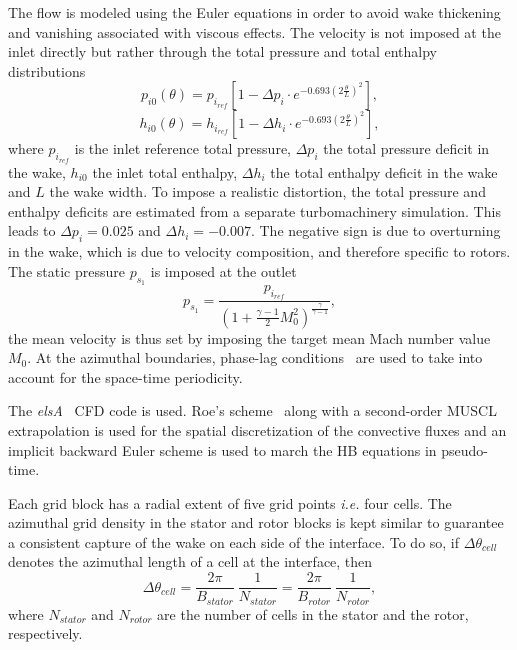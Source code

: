 The flow is modeled using the 
Euler equations in order to avoid wake thickening and vanishing
associated with viscous effects. 
The velocity is not imposed at the inlet directly
but rather through the total pressure and total enthalpy distributions
\begin{equation}
  \label{eq:rotatingblocks_ptot}
    p_{i0} (\theta) = p_{i_{ref}} \left[1 - 
        \Delta p_i \cdot e^{
          -0.693 \left( 2 \frac{\theta}{L} \right) ^ 2}\right],
\end{equation}
\begin{equation}
  \label{eq:rotatingblocks_htot}
    h_{i0} (\theta) = h_{i_{ref}} \left[1- 
        \Delta h_i \cdot e^{
          -0.693 \left( 2 \frac{\theta}{L} \right) ^ 2}\right],
\end{equation}
where $p_{i_{ref}}$ is the inlet reference total pressure, $\Delta p_i$ the total pressure
deficit in the wake,
$h_{i0}$ the inlet total enthalpy, $\Delta h_i$ the total enthalpy
deficit in the wake and $L$ the wake width.
To impose a realistic distortion, the total pressure and
enthalpy deficits are estimated from a separate turbomachinery simulation.
This leads to $\Delta p_i = 0.025$ and 
$\Delta h_i = - 0.007$.
The negative sign is due to overturning in the wake, which
is due to velocity composition, and therefore specific to rotors.
The static pressure $p_{s_1}$ is imposed at the outlet
\begin{equation}
    p_{s_1} = \frac{p_{i_{ref}}}{\left(1 + 
    \frac{\gamma - 1}{2} M_{0}^2 \right) ^ {\frac{\gamma}{ \gamma - 1}}} ,
\end{equation}
the mean velocity is thus set by imposing the
target mean Mach number value $M_{0}$.
At the azimuthal boundaries, phase-lag conditions~\cite{Erdos1977} 
are used to take into account for the space-time periodicity.

The \textit{elsA}~\cite{Cambier2013} CFD code is used.
Roe's scheme~\cite{Roe1981} along with a second-order MUSCL extrapolation 
is used for the spatial discretization of
the convective fluxes and an implicit backward Euler scheme is used
to march the HB equations in pseudo-time.

Each grid block has a radial extent of five grid points \emph{i.e.} four cells. 
The azimuthal grid density in the stator and rotor blocks is kept similar
to guarantee a consistent capture of the wake on each side of the interface.
To do so, if $\Delta \theta_{cell}$ denotes the azimuthal length of a cell
at the interface, then
\begin{equation}
   \Delta \theta_{cell} = \frac{2\pi}{B_{stator}}~\frac{1}{N_{stator}}
   = \frac{2\pi}{B_{rotor}}~\frac{1}{N_{rotor}},
   \label{eq:az_spatial_discretization_1}
\end{equation}
where $N_{stator}$ and $N_{rotor}$ are the number of cells
in the stator and the rotor, respectively. 

